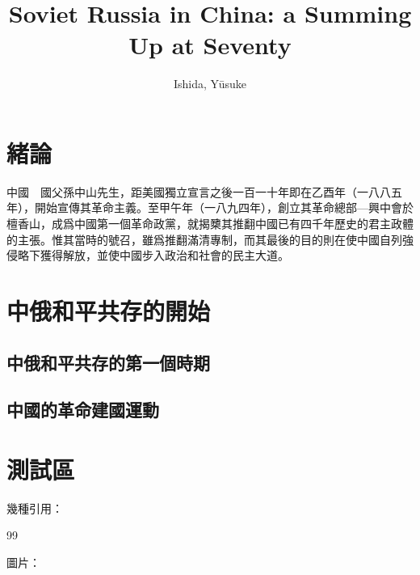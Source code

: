\documentclass[]{nd}
\institute{Graduate Institute of Tridemism}{三民主義研究所}
\title{Soviet Russia in China: a Summing Up at Seventy}{蘇俄在中國——中國與俄共三十年經歷紀要}
\author{Ishida, Yūsuke}{常凱申}
\begin{document}
\makecover

\tableofcontents
\listoffiguresandtables
\mainmatter


\chapter{緒論}
中國　國父孫中山先生，距美國獨立宣言之後一百一十年即在乙酉年（一八八五年），開始宣傳其革命主義。至甲午年（一八九四年），創立其革命總部—興中會於檀香山，成爲中國第一個革命政黨，就揭櫫其推翻中國已有四千年歷史的君主政體的主張。惟其當時的號召，雖爲推翻滿清專制，而其最後的目的則在使中國自列強侵略下獲得解放，並使中國步入政治和社會的民主大道。

\chapter{中俄和平共存的開始}

\section{中俄和平共存的第一個時期}

\section{中國的革命建國運動}

\chapter{測試區}

幾種引用：

\cite{洛克政府論}



\citep{洛克政府論}{99}


\vspace{2cm}

圖片：
\end{document}
